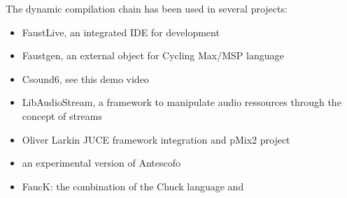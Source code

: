 The dynamic compilation chain has been used in several projects:

\begin{itemize}
\item FaustLive, an integrated IDE for \faust development
\item Faustgen, an external object for Cycling Max/MSP language
\item Csound6, see this demo video
\item LibAudioStream, a framework to manipulate audio ressources through the concept of streams
\item Oliver Larkin JUCE framework integration and pMix2 project
\item an experimental version of Antescofo
\item FaucK: the combination of the Chuck language and \faust 
\end{itemize}